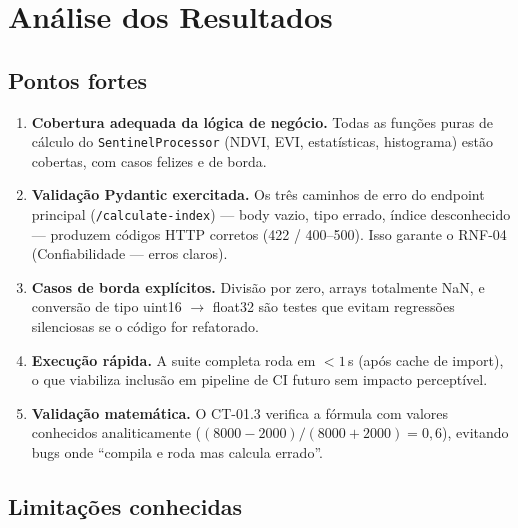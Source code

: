 \documentclass[11pt, a4paper]{article}
\begin{document}
\section{Análise dos Resultados}

\subsection{Pontos fortes}

\begin{enumerate}
  \item \textbf{Cobertura adequada da lógica de negócio.} Todas as funções puras de cálculo do \texttt{SentinelProcessor} (NDVI, EVI, estatísticas, histograma) estão cobertas, com casos felizes e de borda.
  \item \textbf{Validação Pydantic exercitada.} Os três caminhos de erro do endpoint principal (\texttt{/calculate-index}) --- body vazio, tipo errado, índice desconhecido --- produzem códigos HTTP corretos (422 / 400--500). Isso garante o RNF-04 (Confiabilidade --- erros claros).
  \item \textbf{Casos de borda explícitos.} Divisão por zero, arrays totalmente NaN, e conversão de tipo uint16 $\rightarrow$ float32 são testes que evitam regressões silenciosas se o código for refatorado.
  \item \textbf{Execução rápida.} A suite completa roda em $< 1$\,s (após cache de import), o que viabiliza inclusão em pipeline de CI futuro sem impacto perceptível.
  \item \textbf{Validação matemática.} O CT-01.3 verifica a fórmula com valores conhecidos analiticamente ($(8000-2000)/(8000+2000) = 0{,}6$), evitando bugs onde ``compila e roda mas calcula errado''.
\end{enumerate}

\subsection{Limitações conhecidas}
\end{document}
